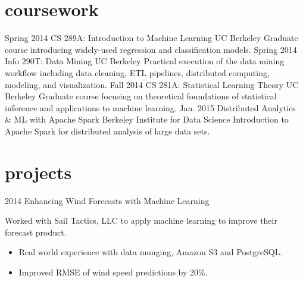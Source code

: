 \documentclass[]{friggeri-cv} %
\begin{document}
\section{coursework}

\begin{entrylist}
\entry
{Spring 2014}
{CS 289A: Introduction to Machine Learning}
{UC Berkeley}
{Graduate course introducing widely-used regression and classification models.} 
\entry
{Spring 2014}
{Info 290T: Data Mining}
{UC Berkeley}
{Practical execution of the data mining workflow including data cleaning, ETL pipelines, distributed computing, modeling, and visualization.}
\entry
{Fall 2014}
{CS 281A: Statistical Learning Theory}
{UC Berkeley}
{Graduate course focusing on theoretical foundations of statistical inference and applications to machine learning.}
\entry
{Jan. 2015}
{Distributed Analytics \& ML with Apache Spark}
{Berkeley Institute for Data Science}
{Introduction to Apache Spark for distributed analysis of large data sets.}
\end{entrylist}


\section{projects}

\begin{entrylist}
\entry
{2014}
{Enhancing Wind Forecasts with Machine Learning}
{}
{Worked with Sail Tactics, LLC to apply machine learning to improve their forecast product.\begin{itemize}
\item Real world experience with data munging, Amazon S3 and PostgreSQL.
\item Improved RMSE of wind speed predictions by 20\%.
\end{itemize}
}
\end{entrylist}

\end{document}
